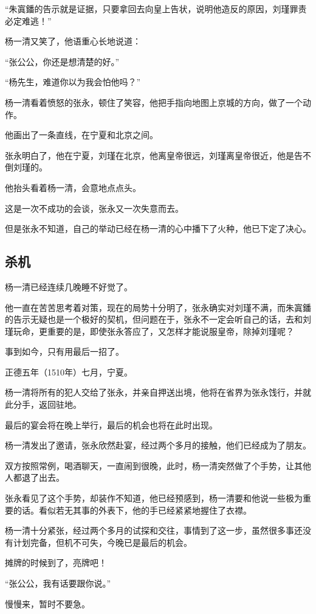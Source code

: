 \begin{multicols}{\theparacolNo}
		“朱寘鐇的告示就是证据，只要拿回去向皇上告状，说明他造反的原因，刘瑾罪责必定难逃！”

		杨一清又笑了，他语重心长地说道：

		“张公公，你还是想清楚的好。”

		“杨先生，难道你以为我会怕他吗？”

		杨一清看着愤怒的张永，顿住了笑容，他把手指向地图上京城的方向，做了一个动作。

		他画出了一条直线，在宁夏和北京之间。

		张永明白了，他在宁夏，刘瑾在北京，他离皇帝很远，刘瑾离皇帝很近，他是告不倒刘瑾的。

		他抬头看着杨一清，会意地点点头。

		这是一次不成功的会谈，张永又一次失意而去。

		但是张永不知道，自己的举动已经在杨一清的心中播下了火种，他已下定了决心。

		\subsection{杀机}
		杨一清已经连续几晚睡不好觉了。

		他一直在苦苦思考着对策，现在的局势十分明了，张永确实对刘瑾不满，而朱寘鐇的告示无疑也是一个极好的契机，但问题在于，张永不一定会听自己的话，去和刘瑾玩命，更重要的是，即使张永答应了，又怎样才能说服皇帝，除掉刘瑾呢？

		事到如今，只有用最后一招了。

		正德五年（1510年）七月，宁夏。

		杨一清将所有的犯人交给了张永，并亲自押送出境，他将在省界为张永饯行，并就此分手，返回驻地。

		最后的宴会将在晚上举行，最后的机会也将在此时出现。

		杨一清发出了邀请，张永欣然赴宴，经过两个多月的接触，他们已经成为了朋友。

		双方按照常例，喝酒聊天，一直闹到很晚，此时，杨一清突然做了个手势，让其他人都退了出去。

		张永看见了这个手势，却装作不知道，他已经预感到，杨一清要和他说一些极为重要的话。看似若无其事的外表下，他的手已经紧紧地握住了衣襟。

		杨一清十分紧张，经过两个多月的试探和交往，事情到了这一步，虽然很多事还没有计划完备，但机不可失，今晚已是最后的机会。

		摊牌的时候到了，亮牌吧！

		“张公公，我有话要跟你说。”

		慢慢来，暂时不要急。


\end{multicols}
